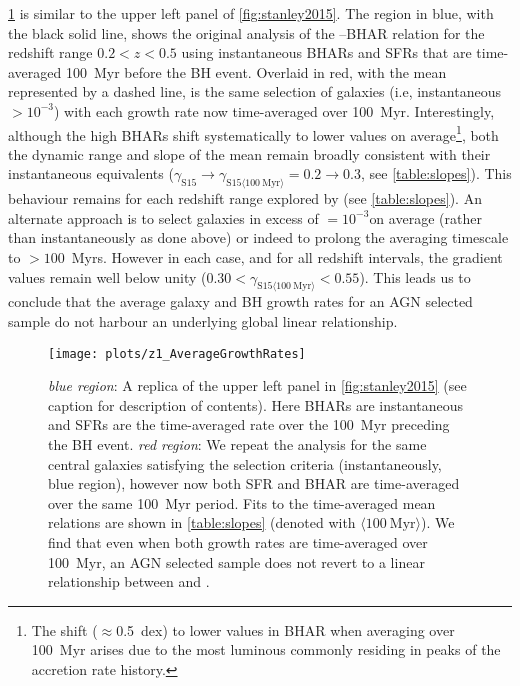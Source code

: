 \cref{fig:avandinst} is similar to the upper left panel of
\cref{fig:stanley2015}. The region in blue, with the black solid line, shows
the original analysis of the --BHAR relation for the redshift range
$0.2 < z < 0.5$ using instantaneous BHARs and SFRs that are time-averaged 100~Myr
before the BH event. Overlaid in red, with the mean represented by a dashed
line, is the same selection of galaxies (i.e, instantaneous \BHAR $>
10^{-3}$\Msolyr) with each growth rate now time-averaged over 100~Myr.
Interestingly, although the high BHARs shift systematically to lower values on
average\footnote{The shift ($\approx$0.5~dex) to lower values in BHAR when
averaging over 100~Myr arises due to the most luminous 
commonly residing in peaks of the accretion rate history.}, both the dynamic
range and slope of the mean remain broadly consistent with their instantaneous
equivalents ($\gamma_{\mathrm{S15}} \rightarrow \gamma_{\mathrm{S15} \langle
100~\mathrm{Myr} \rangle} = 0.2 \rightarrow 0.3$, see \cref{table:slopes}).
This behaviour remains for each redshift range explored by \citet{Stanley2015}
(see \cref{table:slopes}).  An alternate approach is to select galaxies in
excess of \BHAR $= 10^{-3}$\Msolyr on average (rather than instantaneously as
done above) or indeed to prolong the averaging timescale to $> 100$~Myrs.
However in each case, and for all redshift intervals, the gradient values
remain well below unity ($0.30 < \gamma_{\mathrm{S15} \langle 100~\mathrm{Myr}
\rangle} < 0.55$).  This leads us to conclude that the average galaxy and BH
growth rates for an AGN selected sample do not harbour an underlying global
linear relationship. 

\begin{figure}
\texttt{[image: plots/z1\_AverageGrowthRates]}

\caption{\textit{blue region}: A replica of the upper left panel in
\cref{fig:stanley2015} (see caption for description of contents). Here BHARs
are instantaneous and SFRs are the time-averaged rate over the 100~Myr
preceding the BH event. \textit{red region}: We repeat the analysis for the
same central galaxies satisfying the \citet{Stanley2015} selection criteria
(instantaneously, blue region), however now both SFR and BHAR are time-averaged
over the same 100~Myr period.  Fits to the time-averaged mean relations are
shown in \cref{table:slopes} (denoted with $\langle 100~ \mathrm{Myr}
\rangle$). We find that even when both growth rates are time-averaged over
100~Myr, an AGN selected sample does not revert to a linear relationship
between \SFR and \BHAR.}

\label{fig:avandinst} \end{figure}

